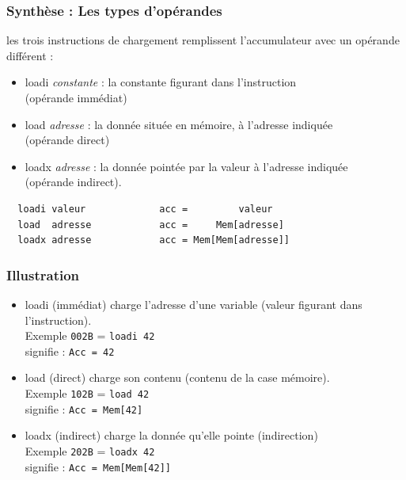 \begin{frame}[containsverbatim]
\frametitle{Synthèse : Les types d'opérandes}  


les trois instructions de chargement remplissent l'accumulateur avec
un opérande différent :

\begin{itemize}
\item
\alert{loadi} \emph{constante}  :
la constante figurant dans l'instruction \\ (\alert{opérande immédiat})

\item
\alert{load} \emph{adresse} : 
la donnée située en mémoire, à l'adresse indiquée \\ (\alert{opérande direct})


\item
\alert{loadx} \emph{adresse} :
la donnée pointée par la valeur à l'adresse indiquée \\ (\alert{opérande indirect}).
\end{itemize}

\begin{verbatim}
  loadi valeur             acc =         valeur
  load  adresse            acc =     Mem[adresse]
  loadx adresse            acc = Mem[Mem[adresse]]
\end{verbatim}

\end{frame}

\begin{frame}[containsverbatim]
\frametitle{Illustration}
\begin{itemize}
\item \alert{loadi} (immédiat) charge l'\alert{adresse} d'une variable
(valeur figurant dans l'instruction). \\
Exemple \texttt{002B} = \texttt{loadi 42}
\\ signifie : 
\texttt{Acc = 42}

\item \alert{load} (direct) charge son \alert{contenu} (contenu de la case mémoire).\\
Exemple \texttt{102B} = \texttt{load 42} 
\\ signifie  : 
\verb+Acc = Mem[42]+
\item \alert{loadx} (indirect) charge la donnée qu'elle pointe (\alert{indirection})\\
Exemple \texttt{202B} = \texttt{loadx 42} 
\\ signifie : 
\verb+Acc = Mem[Mem[42]]+

\end{itemize}


\end{frame}





